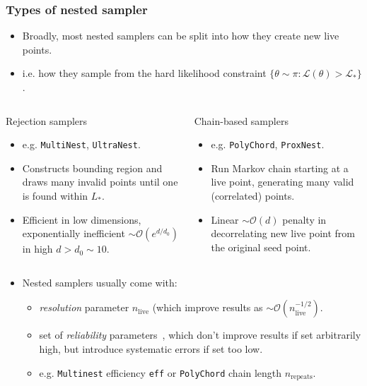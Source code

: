 \documentclass[aspectratio=169]{beamer}
\begin{document}
\begin{frame}
    \frametitle{Types of nested sampler}
    \begin{itemize}
        \item Broadly, most nested samplers can be split into how they create new live points.
        \item i.e. how they sample from the hard likelihood constraint $\{\theta\sim \pi : \mathcal{L}(\theta)>\mathcal{L}_* \}$.
    \end{itemize}
    \vspace{-10pt}
    \begin{columns}[t]
        \begin{block}{Rejection samplers}
            \begin{itemize}
                \item e.g. \texttt{MultiNest}, \texttt{UltraNest}.
                \item Constructs bounding region and draws many invalid points until one is found within $L_*$.
                \item Efficient in low dimensions, exponentially inefficient $\sim\mathcal{O}(e^{d/d_0})$ in high  $d>d_0\sim10$.
            \end{itemize}
        \end{block}
        \begin{block}{Chain-based samplers}
            \begin{itemize}
                \item e.g. \texttt{PolyChord}, \texttt{ProxNest}.
                \item Run Markov chain starting at a live point, generating many valid (correlated) points.
                \item Linear $\sim\mathcal{O}(d)$ penalty in decorrelating new live point from the original seed point.
            \end{itemize}
        \end{block}
    \end{columns}
    \vspace{15pt}
    \begin{itemize}
        \item Nested samplers usually come with:
            \begin{itemize}
                \item \emph{resolution} parameter $n_\mathrm{live}$ (which improve results as $\sim\mathcal{O}(n_\mathrm{live}^{-1/2})$.
                    \item set of \emph{reliability} parameters~, which don't improve results if set arbitrarily high, but introduce systematic errors if set too low.
                    \item e.g. \texttt{Multinest} efficiency \texttt{eff} or \texttt{PolyChord} chain length $n_\mathrm{repeats}$.
            \end{itemize}
    \end{itemize}
\end{frame}
\end{document}
